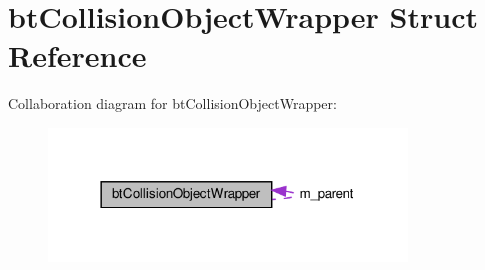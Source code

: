 \hypertarget{structbtCollisionObjectWrapper}{}\section{bt\+Collision\+Object\+Wrapper Struct Reference}
\label{structbtCollisionObjectWrapper}


Collaboration diagram for bt\+Collision\+Object\+Wrapper\+:
\nopagebreak
\begin{figure}[H]
\begin{center}
\leavevmode
\includegraphics[width=270pt]{structbtCollisionObjectWrapper__coll__graph}
\end{center}
\end{figure}
